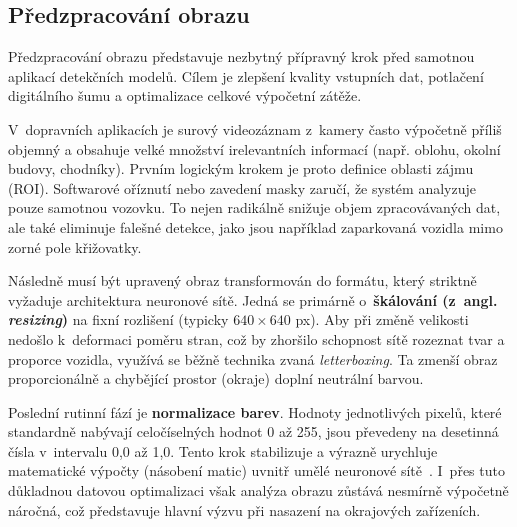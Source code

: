 
\subsection{Předzpracování obrazu}
Předzpracování obrazu představuje nezbytný přípravný krok před samotnou aplikací detekčních modelů. Cílem je zlepšení kvality vstupních dat, potlačení digitálního šumu a optimalizace celkové výpočetní zátěže. 

V~dopravních aplikacích je surový videozáznam z~kamery často výpočetně příliš objemný a obsahuje velké množství irelevantních informací (např. oblohu, okolní budovy, chodníky). Prvním logickým krokem je proto definice oblasti zájmu (ROI). Softwarové oříznutí nebo zavedení masky zaručí, že systém analyzuje pouze samotnou vozovku. To nejen radikálně snižuje objem zpracovávaných dat, ale také eliminuje falešné detekce, jako jsou například zaparkovaná vozidla mimo zorné pole křižovatky.

Následně musí být upravený obraz transformován do formátu, který striktně vyžaduje architektura neuronové sítě. Jedná se primárně o~\textbf{škálování (z~angl. \textit{resizing})} na fixní rozlišení (typicky $640 \times 640$ px). Aby při změně velikosti nedošlo k~deformaci poměru stran, což by zhoršilo schopnost sítě rozeznat tvar a proporce vozidla, využívá se běžně technika zvaná \textit{letterboxing}. Ta zmenší obraz proporcionálně a chybějící prostor (okraje) doplní neutrální barvou. 

Poslední rutinní fází je \textbf{normalizace barev}. Hodnoty jednotlivých pixelů, které standardně nabývají celočíselných hodnot 0 až 255, jsou převedeny na desetinná čísla v~intervalu 0,0 až 1,0. Tento krok stabilizuje a výrazně urychluje matematické výpočty (násobení matic) uvnitř umělé neuronové sítě~\cite{szeliski_computer_vision}. I~přes tuto důkladnou datovou optimalizaci však analýza obrazu zůstává nesmírně výpočetně náročná, což představuje hlavní výzvu při nasazení na okrajových zařízeních.

